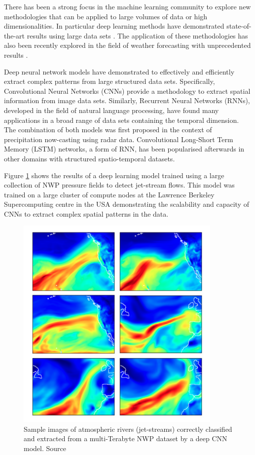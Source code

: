 \medskip

There has been a strong focus in the machine learning community to explore new methodologies that can be applied to large volumes of data or high dimensionalities. In particular deep learning methods \citep{lecun2015deep} have demonstrated state-of-the-art results using large data sets \citep{deng2009imagenet,openimages}. The application of these methodologies has also been recently explored in the field of weather forecasting with unprecedented results \citep{xingjian2015convolutional,liu2016application,rasp2018deep}.

\medskip

Deep neural network models have demonstrated to effectively and efficiently extract complex patterns from large structured data sets. Specifically, Convolutional Neural Networks (CNNs) provide a methodology to extract spatial information from image data sets. Similarly, Recurrent Neural Networks (RNNs), developed in the field of natural language processing, have found many applications in a broad range of data sets containing the temporal dimension. The combination of both models was first proposed in the context of precipitation now-casting \citep{xingjian2015convolutional} using radar data. Convolutional Long-Short Term Memory (LSTM) networks, a form of RNN, has been popularised afterwards in other domains with structured spatio-temporal datasets. 

\medskip

Figure \ref{deep_clasif} shows the results of a deep learning model trained using a large collection of NWP pressure fields to detect jet-stream flows. This model was trained on a large cluster of compute nodes at the Lawrence Berkeley Supercomputing centre in the USA demonstrating the scalability and capacity of CNNs to extract complex spatial patterns in the data.

\medskip

\begin{figure}[h]
 \centerline{\includegraphics[width=10cm]{deep_classif.png}} \caption{Sample images of atmospheric rivers (jet-streams) correctly classified and extracted from a multi-Terabyte NWP dataset by a deep CNN model. Source \citep{liu2016application}}\label{deep_clasif}
\end{figure}

